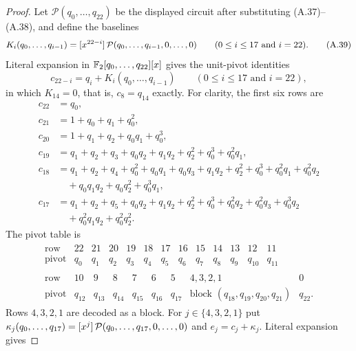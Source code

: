 \begin{proof}
Let $\mathcal P(q_0,\ldots,q_{22})$ be the displayed circuit after
substituting (A.37)--(A.38), and define the baselines
\[
 K_i(q_0,\ldots,q_{i-1})
  =\coeff{\mathcal P(q_0,\ldots,q_{i-1},0,\ldots,0)}{22-i}
  \qquad(0\le i\le17\text{ and }i=22).
                                                                    \tag{A.39}\label{eq:char2-23-baseline}
\]
Literal expansion in $\F_2[q_0,\ldots,q_{22}][x]$ gives the unit-pivot
identities
\[
 c_{22-i}=q_i+K_i(q_0,\ldots,q_{i-1})\qquad(0\le i\le17\text{ and }i=22),
                                                                    \tag{A.40}\label{eq:char2-23-triangular}
\]
in which $K_{14}=0$, that is, $c_8=q_{14}$ exactly.  For clarity, the first
six rows are
\[
\begin{aligned}
c_{22}&=q_0,\\
c_{21}&=1+q_0+q_1+q_0^2,\\
c_{20}&=1+q_1+q_2+q_0q_1+q_0^3,\\
c_{19}&=q_1+q_2+q_3+q_0q_2+q_1q_2+q_2^2+q_0^3+q_0^2q_1,\\
c_{18}&=q_1+q_2+q_4+q_0^2+q_0q_1+q_0q_3+q_1q_2+q_2^2+q_0^3+q_0^2q_1+q_0^2q_2\\
      &\quad+q_0q_1q_2+q_0q_2^2+q_0^3q_1,\\
c_{17}&=q_1+q_2+q_5+q_0q_2+q_1q_2+q_2^2+q_0^3+q_0^2q_2+q_0^2q_3+q_0^3q_2\\
      &\quad+q_0^2q_1q_2+q_0^2q_2^2.
\end{aligned}                                                     \tag{A.41}\label{eq:char2-23-first-rows}
\]
The pivot table is
\[
\begin{gathered}
\begin{array}{c|rrrrrrrrrrrr}
\text{row}&22&21&20&19&18&17&16&15&14&13&12&11\\ \hline
\text{pivot}&q_0&q_1&q_2&q_3&q_4&q_5&q_6&q_7&q_8&q_9&q_{10}&q_{11}
\end{array}\\[1ex]
\begin{array}{c|rrrrrrcr}
\text{row}&10&9&8&7&6&5&4,3,2,1&0\\ \hline
\text{pivot}&q_{12}&q_{13}&q_{14}&q_{15}&q_{16}&q_{17}
 &\text{block }(q_{18},q_{19},q_{20},q_{21})&q_{22}.
\end{array}
\end{gathered}                                                     \tag{A.42}\label{eq:char2-23-pivot-table}
\]
Rows $4,3,2,1$ are decoded as a block.  For $j\in\{4,3,2,1\}$ put
$\kappa_j(q_0,\ldots,q_{17})=\coeff{\mathcal P(q_0,\ldots,q_{17},0,\ldots,0)}{j}$
and $e_j=c_j+\kappa_j$.  Literal expansion gives

\end{proof}
